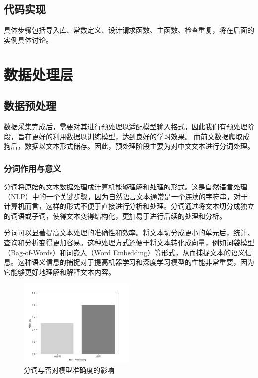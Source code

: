 \documentclass[UTF8,a4paper,15pt,titlepage,oneside]{ctexbook}
\begin{document}
\subsection{代码实现}


具体步骤包括导入库、常数定义、设计请求函数、主函数、检查重复，将在后面的实例具体讨论。
  
\section{数据处理层}

\subsection{数据预处理}

数据采集完成后，需要对其进行预处理以适配模型输入格式，因此我们有预处理阶段，旨在更好的利用数据以训练模型，达到良好的学习效果。
而前文数据爬取成狗后，数据以文本形式储存。因此，预处理阶段主要为对中文文本进行分词处理。

\subsubsection{分词作用与意义}

分词将原始的文本数据处理成计算机能够理解和处理的形式。这是自然语言处理（NLP）中的一个关键步骤，因为自然语言文本通常是一个连续的字符串，对于计算机而言，这样的形式不便于直接进行分析和处理。分词通过将文本切分成独立的词语或子词，使得文本变得结构化，更加易于进行后续的处理和分析。

分词可以显著提高文本处理的准确性和效率。将文本切分成更小的单元后，统计、查询和分析变得更加容易。这种处理方式还便于将文本转化成向量，例如词袋模型（Bag-of-Words）和词嵌入（Word Embedding）等形式，从而捕捉文本的语义信息。这种语义信息的捕捉对于提高机器学习和深度学习模型的性能非常重要，因为它能够更好地理解和解释文本内容。

\begin{figure}[H]
  \centering
  \includegraphics[width=0.5\textwidth,keepaspectratio=false]{pictures/40.png} %
  \caption{分词与否对模型准确度的影响}
  
\end{figure}
\end{document}
